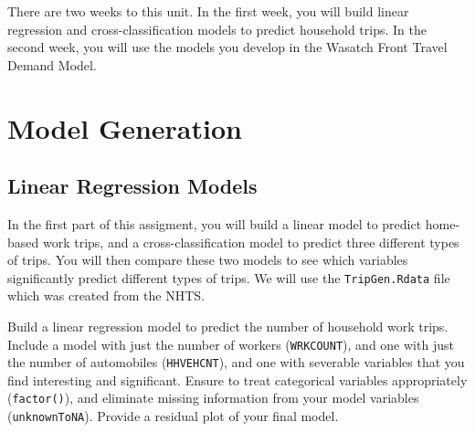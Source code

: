There are two weeks to this unit. In the first week, you will build linear
regression and cross-classification models to predict household trips. In the
second week, you will use the models you develop in the Wasatch Front Travel
Demand Model.


\section{Model Generation}
\subsection{Linear Regression Models}
In the first part of this assigment, you will build a linear model to predict
home-based work trips, and a cross-classification model to predict three
different types of trips. You will then compare these two models to see which
variables significantly predict different types of trips. We will use the 
\texttt{TripGen.Rdata} file which was created from the NHTS.

\begin{knitrout}
\color{fgcolor}\begin{kframe}
\begin{alltt}
\hlstd{(}\hlstd{)}
\end{alltt}
\end{kframe}
\end{knitrout}


Build a linear regression model to predict the number of household work trips.
Include a model with just the number of workers (\verb#WRKCOUNT#), and one with just
the number of automobiles (\verb#HHVEHCNT#), and one with severable variables
that you find interesting and significant. Ensure to treat categorical variables
appropriately (\verb#factor()#), and eliminate missing information from your
model variables (\verb#unknownToNA#). Provide a residual plot of your final
model.

